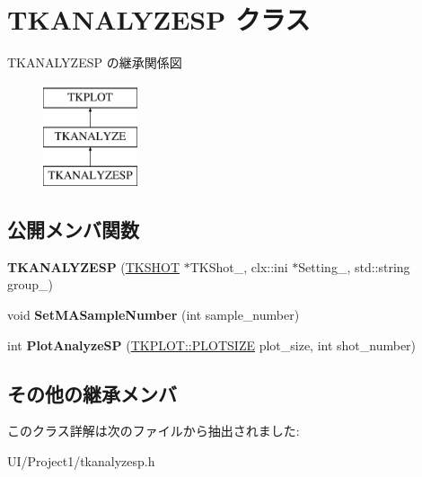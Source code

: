 \hypertarget{class_t_k_a_n_a_l_y_z_e_s_p}{}\section{T\+K\+A\+N\+A\+L\+Y\+Z\+E\+SP クラス}
\label{class_t_k_a_n_a_l_y_z_e_s_p}
T\+K\+A\+N\+A\+L\+Y\+Z\+E\+SP の継承関係図\begin{figure}[H]
\begin{center}
\leavevmode
\includegraphics[height=3.000000cm]{class_t_k_a_n_a_l_y_z_e_s_p}
\end{center}
\end{figure}
\subsection*{公開メンバ関数}
\begin{DoxyCompactItemize}
\item 
\mbox{\label{class_t_k_a_n_a_l_y_z_e_s_p_aa2acb0801185f8627c598bde433e53de}} 
{\bfseries T\+K\+A\+N\+A\+L\+Y\+Z\+E\+SP} (\hyperlink{class_t_k_s_h_o_t}{T\+K\+S\+H\+OT} $\ast$T\+K\+Shot\+\_\+, clx\+::ini $\ast$Setting\+\_\+, std\+::string group\+\_\+)
\item 
\mbox{\label{class_t_k_a_n_a_l_y_z_e_s_p_a960444249fc72e7b65c8d7176be04201}} 
void {\bfseries Set\+M\+A\+Sample\+Number} (int sample\+\_\+number)
\item 
\mbox{\label{class_t_k_a_n_a_l_y_z_e_s_p_a1b8358ffef8bcce3c2855f523247d9bb}} 
int {\bfseries Plot\+Analyze\+SP} (\hyperlink{class_t_k_p_l_o_t_a158082ae168750554cf23edde9a27416}{T\+K\+P\+L\+O\+T\+::\+P\+L\+O\+T\+S\+I\+ZE} plot\+\_\+size, int shot\+\_\+number)
\end{DoxyCompactItemize}
\subsection*{その他の継承メンバ}


このクラス詳解は次のファイルから抽出されました\+:\begin{DoxyCompactItemize}
\item 
U\+I/\+Project1/tkanalyzesp.\+h\end{DoxyCompactItemize}
